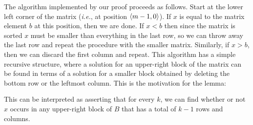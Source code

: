 The algorithm implemented by our proof proceeds as follows.  Start at the
lower left corner of the matrix ({\em i.e.}, at position $\langle m-1,0 \rangle$).  If
$x$ is equal to
the matrix element $b$ at this position, then we are done.  If $x<b$ 
then since the matrix is sorted $x$ must be smaller than everything in the
last row, so we can throw away the last row and repeat the procedure with the
smaller
matrix.  Similarly, if $x>b$, then we can discard the first column and
repeat. This algorithm has a simple recursive structure, where a solution for an
upper-right block of the matrix can be found in terms of a solution for a
smaller block obtained by deleting the bottom row or the leftmost column.  
This is the motivation for the lemma:
\begin{Numath}
%
\end{Numath}%
This can be interpreted as asserting that for every $k$, we can find whether or
not $x$ occurs in any upper-right block of $B$ that has a total of $k-1$ rows and
columns.  


